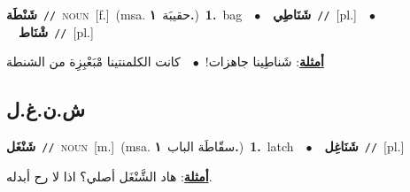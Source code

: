 \documentclass[10pt,a4paper,twoside]{article} %
\begin{document}
\begin{multicols}{2}
{\setlength\topsep{0pt}\textbf{\foreignlanguage{arabic}{شَنْطَة}}\ {\color{gray}\texttt{//}\color{black}}\ \textsc{noun}\ [f.]\ \color{gray}(msa. \foreignlanguage{arabic}{حقيبَة}~\foreignlanguage{arabic}{\textbf{١.}})\color{black}\ \textbf{1.}~bag\ \ $\bullet$\ \ \setlength\topsep{0pt}\textbf{\foreignlanguage{arabic}{شَنَاطِي}}\ {\color{gray}\texttt{//}\color{black}}\ [pl.]\ \ $\bullet$\ \ \setlength\topsep{0pt}\textbf{\foreignlanguage{arabic}{شْنَاط}}\ {\color{gray}\texttt{//}\color{black}}\ [pl.]\  \begin{flushright}\color{gray}\foreignlanguage{arabic}{\textbf{\underline{\foreignlanguage{arabic}{أمثلة}}}: شَناطِينا جاهزات!\ $\bullet$\ \  كانت الكلمنتينا مْبَعْبِزِة من الشنطة}\end{flushright}\color{black}} \vspace{2mm}

\vspace{-3mm}
\subsection*{\color{blue}\foreignlanguage{arabic}{ش.ن.غ.ل}\color{blue}{}} 

{\setlength\topsep{0pt}\textbf{\foreignlanguage{arabic}{شَنْغَل}}\ {\color{gray}\texttt{//}\color{black}}\ \textsc{noun}\ [m.]\ \color{gray}(msa. \foreignlanguage{arabic}{سقّاطَة الباب}~\foreignlanguage{arabic}{\textbf{١.}})\color{black}\ \textbf{1.}~latch\ \ $\bullet$\ \ \setlength\topsep{0pt}\textbf{\foreignlanguage{arabic}{شَنَاغِل}}\ {\color{gray}\texttt{//}\color{black}}\ [pl.]\  \begin{flushright}\color{gray}\foreignlanguage{arabic}{\textbf{\underline{\foreignlanguage{arabic}{أمثلة}}}: هاد الشَّنْغَل أصلي؟ اذا لا رح أبدله.}\end{flushright}\color{black}} \vspace{2mm}


\end{multicols}
\end{document}
